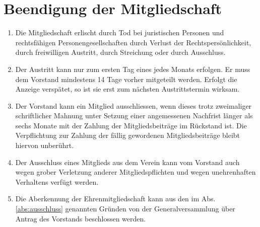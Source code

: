 \documentclass[a4paper,12pt]{article}
\begin{document}
	\section{Beendigung der Mitgliedschaft}
		\label{sec:ende-mitgliedschaft}
		\begin{enumerate}
			\item Die Mitgliedschaft erlischt durch Tod bei juristischen Personen und rechtsfähigen Personengesellschaften durch Verlust der Rechtspersönlichkeit, durch freiwilligen Austritt, durch Streichung oder durch Ausschluss.
			\item Der Austritt kann nur zum ersten Tag eines jedes Monats erfolgen. Er muss dem Vorstand mindestens 14 Tage vorher mitgeteilt werden. Erfolgt die Anzeige verspätet, so ist sie erst zum nächsten Austrittstermin
			wirksam.
			\item Der Vorstand kann ein Mitglied ausschliessen, wenn dieses trotz zweimaliger schriftlicher Mahnung unter Setzung einer angemessenen Nachfrist länger als sechs Monate mit der Zahlung der Mitgliedsbeiträge im Rückstand ist. Die Verpflichtung zur Zahlung der fällig gewordenen Mitgliedsbeiträge bleibt hiervon unberührt.
			\item Der Ausschluss eines Mitglieds aus dem Verein kann vom Vorstand auch wegen grober Verletzung anderer Mitgliedspflichten und wegen unehrenhaften Verhaltens verfügt werden.
			\label{abs:ausschluss}
			\item Die Aberkennung der Ehrenmitgliedschaft kann aus den im Abs. \ref{abs:ausschluss} genannten Gründen von der Generalversammlung über Antrag des Vorstands beschlossen werden.
		\end{enumerate}
\end{document}
